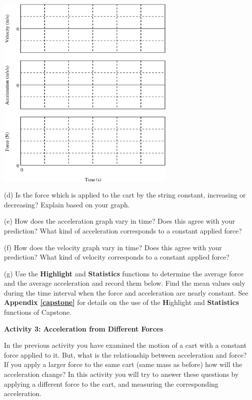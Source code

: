 \vspace{0.3cm}
{\par\centering \includegraphics[width=0.65\textwidth]{force1/force1_fig5.eps} \par}
\vspace{0.3cm}

(d) Is the force which is applied to the cart by the string constant, increasing
or decreasing? Explain based on your graph.
\answerspace{15mm}

\pagebreak[2]
(e) How does the acceleration graph vary in time? Does this agree with your
prediction? What kind of acceleration corresponds to a constant applied force?
\answerspace{20mm}

(f) How does the velocity graph vary in time? Does this agree with your prediction?
What kind of velocity corresponds to a constant applied force?
\answerspace{20mm}

(g) Use the \textbf{Highlight} and \textbf{Statistics} functions to determine 
the average force and the average acceleration
and record them below. Find the mean values only during the time interval when
the force and acceleration are nearly constant. See \textbf{Appendix \ref{capstone}} for details on
the use of the \textbf Highlight and  \textbf{Statistics} functions of Capstone.
\answerspace{20mm}

\textbf{Activity 3: Acceleration from Different Forces }

In the previous activity you have examined the motion of a cart with a constant
force applied to it. But, what is the relationship between acceleration and
force? If you apply a larger force to the same cart (same mass as before) how
will the acceleration change? In this activity you will try to answer these
questions by applying a different force to the cart, and measuring the corresponding
acceleration. 

